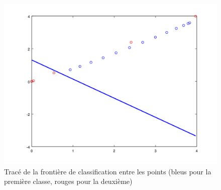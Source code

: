 \documentclass{article}
\begin{document}
         \begin{figure}
           \begin{center}
             \subfigure\includegraphics[scale=0.3]{images/line2D5.png}
             \caption{Tracé de la frontière de classification entre les points (bleus pour la première classe, rouges pour la deuxième)}
           \end{center}
         \end{figure}
\end{document}
